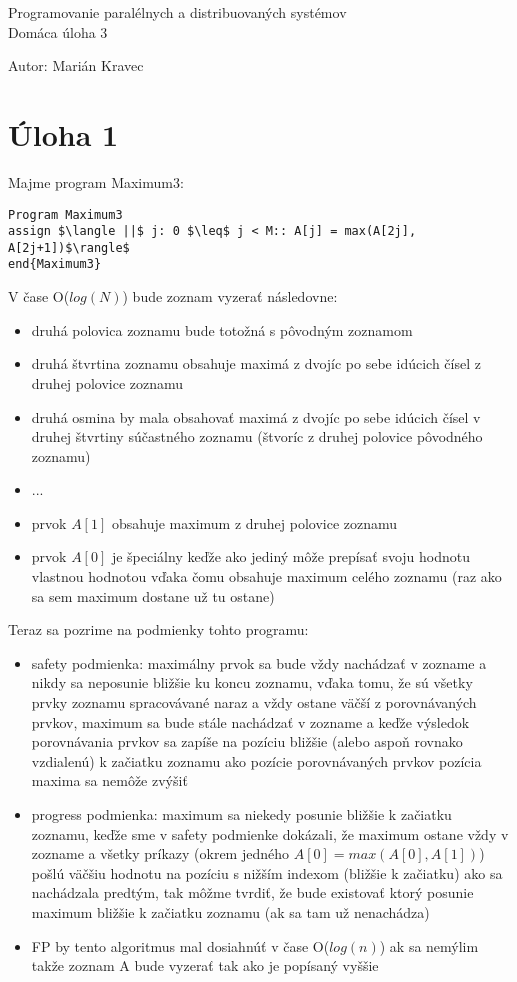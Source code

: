 \documentclass[a4paper]{article}
\begin{document}
 
	
\pagestyle{plain}

\begin{center}
	\sc\large
	Programovanie paralélnych a distribuovaných systémov\\
	Domáca úloha 3
\end{center}

Autor: Marián Kravec

\section{Úloha 1}

Majme program Maximum3:
\begin{lstlisting}
Program Maximum3
assign $\langle ||$ j: 0 $\leq$ j < M:: A[j] = max(A[2j], A[2j+1])$\rangle$
end{Maximum3}
\end{lstlisting}

V čase O($log(N)$) bude zoznam vyzerať následovne:
\begin{itemize}
	\item druhá polovica zoznamu bude totožná s pôvodným zoznamom
	\item druhá štvrtina zoznamu obsahuje maximá z dvojíc po sebe idúcich čísel z druhej polovice zoznamu
	\item druhá osmina by mala obsahovať maximá z dvojíc po sebe idúcich čísel v druhej štvrtiny súčastného zoznamu (štvoríc z druhej polovice pôvodného zoznamu)
	\item ...
	\item prvok $A[1]$ obsahuje maximum z druhej polovice zoznamu
	\item prvok $A[0]$ je špeciálny keďže ako jediný môže prepísať svoju hodnotu vlastnou hodnotou vďaka čomu obsahuje maximum celého zoznamu (raz ako sa sem maximum dostane už tu ostane)
\end{itemize}

Teraz sa pozrime na podmienky tohto programu:
\begin{itemize}
	\item safety podmienka: maximálny prvok sa bude vždy nachádzať v zozname  a nikdy sa neposunie bližšie ku koncu zoznamu, vďaka tomu, že sú všetky prvky zoznamu spracovávané naraz a vždy ostane väčší z porovnávaných prvkov, maximum sa bude stále nachádzať v zozname a keďže výsledok porovnávania prvkov sa zapíše na pozíciu bližšie (alebo aspoň rovnako vzdialenú) k začiatku zoznamu ako pozície porovnávaných prvkov pozícia maxima sa nemôže zvýšiť  
	\item progress podmienka: maximum sa niekedy posunie bližšie k začiatku zoznamu, keďže sme v safety podmienke dokázali, že maximum ostane vždy v zozname a všetky príkazy (okrem jedného $A[0] = max(A[0], A[1])$) pošlú väčšiu hodnotu na pozíciu s nižším indexom (bližšie k začiatku) ako sa nachádzala predtým, tak môžme tvrdiť, že bude existovať ktorý posunie maximum bližšie k začiatku zoznamu (ak sa tam už nenachádza) 
	\item FP by tento algoritmus mal dosiahnúť v čase O($log(n)$) ak sa nemýlim takže zoznam A bude vyzerať tak ako je popísaný vyššie
\end{itemize}
\end{document}
